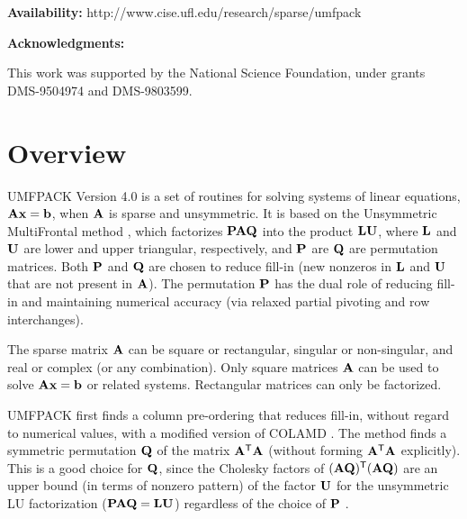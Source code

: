 {\bf Availability:}
    http://www.cise.ufl.edu/research/sparse/umfpack

{\bf Acknowledgments:}

    This work was supported by the National Science Foundation, under
    grants DMS-9504974 and DMS-9803599.

\newpage

\tableofcontents

\newpage
\section{Overview}

UMFPACK Version 4.0 is a set of routines for solving systems of linear
equations, ${\bf{Ax}}={\bf{b}}$, when ${\bf{A}}$ is sparse and unsymmetric.  It is based
on the Unsymmetric MultiFrontal method \cite{DavisDuff97,DavisDuff99},
which factorizes ${\bf{PAQ}}$ into the product ${\bf{LU}}$, where ${\bf{L}}$ and ${\bf{U}}$
are lower and upper triangular, respectively, and ${\bf{P}}$ are ${\bf{Q}}$ are
permutation matrices.  Both ${\bf{P}}$ and ${\bf{Q}}$ are chosen to reduce fill-in
(new nonzeros in ${\bf{L}}$ and ${\bf{U}}$ that are not present in ${\bf{A}}$).  The
permutation ${\bf{P}}$ has the dual role of reducing fill-in and maintaining
numerical accuracy (via relaxed partial pivoting and row interchanges).

The sparse matrix ${\bf{A}}$ can be square or rectangular, singular
or non-singular, and real or complex (or any combination).  Only square
matrices ${\bf{A}}$ can be used to solve ${\bf{Ax}}={\bf{b}}$ or related systems.
Rectangular matrices can only be factorized.

UMFPACK first finds a column pre-ordering that reduces fill-in, without regard
to numerical values, with a modified version of COLAMD
\cite{DavisGilbertLarimoreNg00_algo,DavisGilbertLarimoreNg00,Larimore98}.
The method finds a symmetric permutation ${\bf{Q}}$ of the matrix ${\bf{A}}^{\sf T}{\bf{A}}$
(without forming ${\bf{A}}^{\sf T}{\bf{A}}$ explicitly).  This is a good choice for
${\bf{Q}}$, since the Cholesky factors of ${\bf{(AQ)^{\sf T}(AQ)}}$ are an upper bound (in
terms of nonzero pattern) of the factor ${\bf{U}}$ for the unsymmetric LU
factorization (${\bf{PAQ}}={\bf{LU}}$) regardless of the choice of ${\bf{P}}$
\cite{GeorgeNg85,GeorgeNg87,GilbertNg93}.

